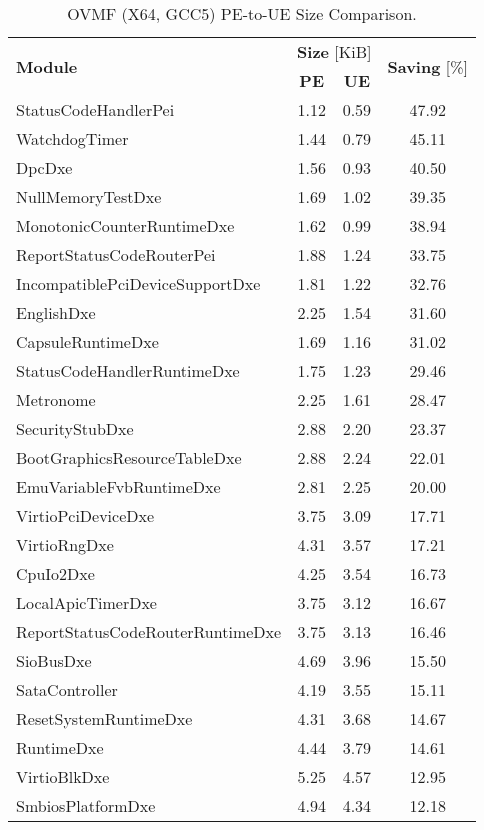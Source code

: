 \begin{longtable}{l c c c}
  \caption{OVMF (X64, GCC5) PE-to-UE Size Comparison.}\\\\
  \toprule
  \multirow{2}{*}[-2pt]{\textbf{Module}} & \multicolumn{2}{c}{\textbf{Size} [KiB]} & \multirow{2}{*}[-2pt]{\textbf{Saving} [\%]}\\
  \cmidrule{2-3}
  & \textbf{PE} & \textbf{UE} &\\
  \midrule
  StatusCodeHandlerPei & 1.12 & 0.59 & 47.92\\
  WatchdogTimer & 1.44 & 0.79 & 45.11\\
  DpcDxe & 1.56 & 0.93 & 40.50\\
  NullMemoryTestDxe & 1.69 & 1.02 & 39.35\\
  MonotonicCounterRuntimeDxe & 1.62 & 0.99 & 38.94\\
  ReportStatusCodeRouterPei & 1.88 & 1.24 & 33.75\\
  IncompatiblePciDeviceSupportDxe & 1.81 & 1.22 & 32.76\\
  EnglishDxe & 2.25 & 1.54 & 31.60\\
  CapsuleRuntimeDxe & 1.69 & 1.16 & 31.02\\
  StatusCodeHandlerRuntimeDxe & 1.75 & 1.23 & 29.46\\
  Metronome & 2.25 & 1.61 & 28.47\\
  SecurityStubDxe & 2.88 & 2.20 & 23.37\\
  BootGraphicsResourceTableDxe & 2.88 & 2.24 & 22.01\\
  EmuVariableFvbRuntimeDxe & 2.81 & 2.25 & 20.00\\
  VirtioPciDeviceDxe & 3.75 & 3.09 & 17.71\\
  VirtioRngDxe & 4.31 & 3.57 & 17.21\\
  CpuIo2Dxe & 4.25 & 3.54 & 16.73\\
  LocalApicTimerDxe & 3.75 & 3.12 & 16.67\\
  ReportStatusCodeRouterRuntimeDxe & 3.75 & 3.13 & 16.46\\
  SioBusDxe & 4.69 & 3.96 & 15.50\\
  SataController & 4.19 & 3.55 & 15.11\\
  ResetSystemRuntimeDxe & 4.31 & 3.68 & 14.67\\
  RuntimeDxe & 4.44 & 3.79 & 14.61\\
  VirtioBlkDxe & 5.25 & 4.57 & 12.95\\
  SmbiosPlatformDxe & 4.94 & 4.34 & 12.18\\

\end{longtable}
